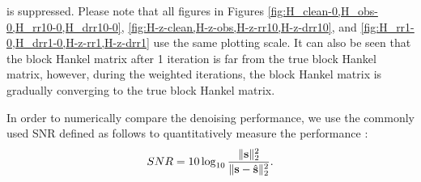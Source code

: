 is suppressed. Please note that all figures in Figures \ref{fig:H_clean-0,H_obs-0,H_rr10-0,H_drr10-0}, \ref{fig:H-z-clean,H-z-obs,H-z-rr10,H-z-drr10}, and \ref{fig:H_rr1-0,H_drr1-0,H-z-rr1,H-z-drr1} use the same plotting scale. It can also be seen that the block Hankel matrix after 1 iteration is far from the true block Hankel matrix, however, during the weighted  iterations, the block Hankel matrix is gradually converging to the true block Hankel matrix.

In order to numerically compare the denoising performance, we use the commonly used SNR defined as follows to quantitatively measure the performance \cite[]{yangkang2015ortho,wencheng2015asa,shuwei2015}:
\begin{equation}
\label{eq:dsnr}
SNR=10\log_{10}\frac{\Arrowvert \mathbf{s} \Arrowvert_2^2}{\Arrowvert \mathbf{s} -\hat{\mathbf{s}}\Arrowvert_2^2}.
\end{equation}
